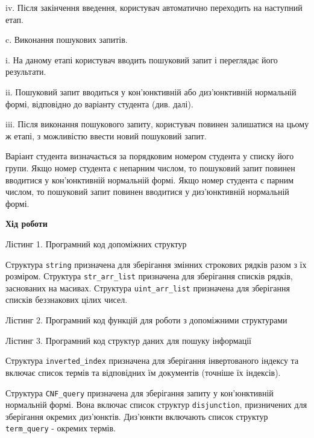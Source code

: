 \documentclass{../../templates/information_retrieval_lab}
\begin{document}
iv. Після закінчення введення, користувач автоматично переходить
на наступний етап.

c. Виконання пошукових запитів.

i. На даному етапі користувач вводить пошуковий запит і
переглядає його результати.

ii. Пошуковий запит вводиться у кон’юнктивній або диз’юнктивній
нормальній формі, відповідно до варіанту студента (див. далі).

iii. Після виконання пошукового запиту, користувач повинен
залишатися на цьому ж етапі, з можливістю ввести новий
пошуковий запит.

Варіант студента визначається за порядковим номером студента у списку
його групи. Якщо номер студента є непарним числом, то пошуковий запит
повинен вводитися у кон’юнктивній нормальній формі. Якщо номер студента є
парним числом, то пошуковий запит повинен вводитися у диз’юнктивній
нормальній формі.

\centerline{\textbf{Хід роботи}}

Лістинг 1. Програмний код допоміжних структур



Структура \texttt{string} призначена для зберігання змінних строкових рядків разом з їх розміром. Структура \texttt{str\_arr\_list} призначена для зберігання списків рядків, заснованих на масивах. Структура \texttt{uint\_arr\_list} призначена для зберігання списків беззнакових цілих чисел.

Лістинг 2. Програмний код функцій для роботи з допоміжними структурами



Лістинг 3. Програмний код структур даних для пошуку інформації



Структура \texttt{inverted\_index} призначена для зберігання інвертованого індексу та включає список термів та відповідних їм документів (точніше їх індексів).

Структура \texttt{CNF\_query} призначена для зберігання запиту у кон'юнктивній нормальній формі. Вона включає список структур \texttt{disjunction}, призничених для зберігання окремих диз'юнктів. Диз'юнкти включають список структур \texttt{term\_query} - окремих термів.
\end{document}
